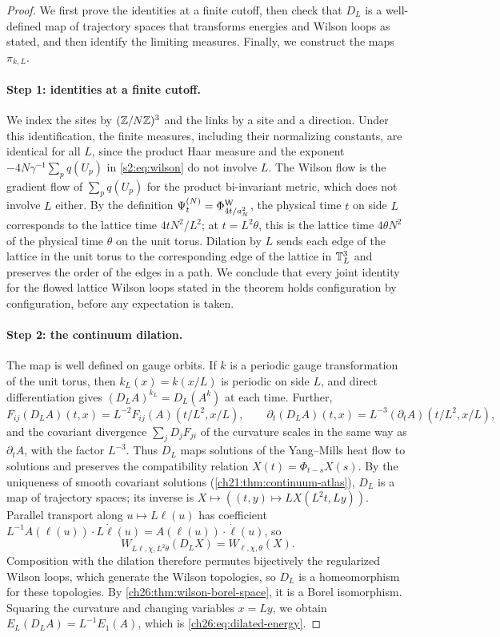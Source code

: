 \begin{proof}
We first prove the identities at a finite cutoff, then check that $D_L$ is a well-defined map of trajectory spaces that transforms energies and Wilson loops as stated, and then identify the limiting measures. Finally, we construct the maps $\pi_{k,L}$.

\paragraph{Step 1: identities at a finite cutoff.}
We index the sites by $(\mathbb Z/N\mathbb Z)^3$ and the links by a site and a direction. Under this identification, the finite measures, including their normalizing constants, are identical for all $L$, since the product Haar measure and the exponent $-4N\gamma^{-1}\sum_pq(U_p)$ in \eqref{s2:eq:wilson} do not involve $L$. The Wilson flow is the gradient flow of $\sum_pq(U_p)$ for the product bi-invariant metric, which does not involve $L$ either. By the definition $\Psi^{(N)}_t=\Phi^{\mathrm W}_{4t/a_N^2}$, the physical time $t$ on side $L$ corresponds to the lattice time $4tN^2/L^2$; at $t=L^2\theta$, this is the lattice time $4\theta N^2$ of the physical time $\theta$ on the unit torus. Dilation by $L$ sends each edge of the lattice in the unit torus to the corresponding edge of the lattice in $\mathbb T_L^3$ and preserves the order of the edges in a path. We conclude that every joint identity for the flowed lattice Wilson loops stated in the theorem holds configuration by configuration, before any expectation is taken.

\paragraph{Step 2: the continuum dilation.}
The map is well defined on gauge orbits. If $k$ is a periodic gauge transformation of the unit torus, then $k_L(x)=k(x/L)$ is periodic on side $L$, and direct differentiation gives $(D_LA)^{k_L}=D_L(A^k)$ at each time. Further,
\[
 F_{ij}(D_LA)(t,x)=L^{-2}F_{ij}(A)(t/L^2,x/L),\qquad
 \partial_t(D_LA)(t,x)=L^{-3}(\partial_tA)(t/L^2,x/L),
\]
and the covariant divergence $\sum_jD_jF_{ji}$ of the curvature scales in the same way as $\partial_tA$, with the factor $L^{-3}$. Thus $D_L$ maps solutions of the Yang--Mills heat flow to solutions and preserves the compatibility relation $X(t)=\Phi_{t-s}X(s)$. By the uniqueness of smooth covariant solutions (\cref{ch21:thm:continuum-atlas}), $D_L$ is a map of trajectory spaces; its inverse is $X\mapsto((t,y)\mapsto LX(L^2t,Ly))$. Parallel transport along $u\mapsto L\ell(u)$ has coefficient $L^{-1}A(\ell(u))\cdot L\dot\ell(u)=A(\ell(u))\cdot\dot\ell(u)$, so
\begin{equation}\label{ch26:eq:dilated-holonomy}
 W_{L\ell,\chi,L^2\theta}(D_LX)=W_{\ell,\chi,\theta}(X).
\end{equation}
Composition with the dilation therefore permutes bijectively the regularized Wilson loops, which generate the Wilson topologies, so $D_L$ is a homeomorphism for these topologies. By \cref{ch26:thm:wilson-borel-space}, it is a Borel isomorphism. Squaring the curvature and changing variables $x=Ly$, we obtain $E_L(D_LA)=L^{-1}E_1(A)$, which is \eqref{ch26:eq:dilated-energy}.


\end{proof}
